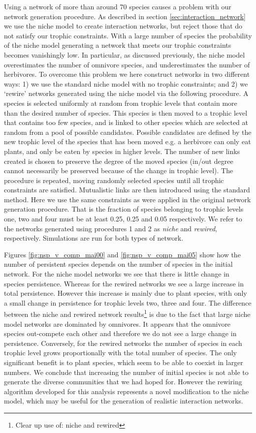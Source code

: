 Using a network of more than around 70 species causes a problem with our network generation procedure. As described in section \ref{sec:interaction_network} we use the niche model to create interaction networks, but reject those that do not satisfy our trophic constraints. With a large number of species the probability of the niche model generating a network that meets our trophic constraints becomes vanishingly low. In particular, as discussed previously, the niche model overestimates the number of omnivore species, and underestimates the number of herbivores. To overcome this problem we here construct networks in two different ways: 1) we use the standard niche model with no trophic constraints; and 2) we `rewire' networks generated using the niche model via the following procedure. A species is selected uniformly at random from trophic levels that contain more than the desired number of species. This species is then moved to a trophic level that contains too few species, and is linked to other species which are selected at random from a pool of possible candidates. Possible candidates are defined by the new trophic level of the species that has been moved e.g. a herbivore can only eat plants, and only be eaten by species in higher levels. The number of new links created is chosen to preserve the degree of the moved species (in/out degree cannot necessarily be preserved because of the change in trophic level). The procedure is repeated, moving randomly selected species until all trophic constraints are satisfied. Mutualistic links are then introduced using the standard method. Here we use the same constraints as were applied in the original network generation procedure. That is the fraction of species belonging to trophic levels one, two and four must be at least 0.25, 0.25 and 0.05 respectively. We refer to the networks generated using procedures 1 and 2 as \emph{niche} and \emph{rewired}, respectively. Simulations are run for both types of network.

Figures \ref{fig:nsp_v_comp_mai00} and \ref{fig:nsp_v_comp_mai05} show how the number of persistent species depends on the number of species in the initial network. For the niche model networks we see that there is little change in species persistence. Whereas for the rewired networks we see a large increase in total persistence. However this increase is mainly due to plant species, with only a small change in persistence for trophic levels two, three and four. The difference between the niche and rewired network results\footnote{Clear up use of: niche and rewired} is due to the fact that large niche model networks are dominated by omnivores. It appears that the omnivore species out-compete each other and therefore we do not see a large change in persistence. Conversely, for the rewired networks the number of species in each trophic level grows proportionally with the total number of species. The only significant benefit is to plant species, which seem to be able to coexist in larger numbers. We conclude that increasing the number of initial species is not able to generate the diverse communities that we had hoped for. However the rewiring algorithm developed for this analysis represents a novel modification to the niche model, which may be useful for the generation of realistic interaction networks.

